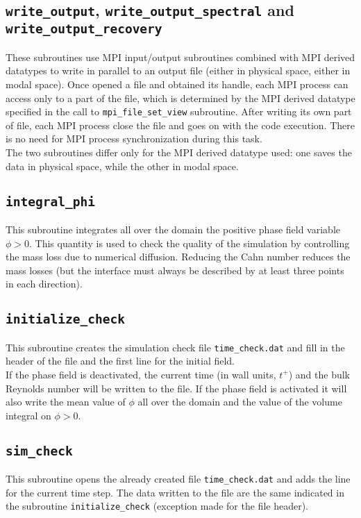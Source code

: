 \subsection{\texttt{write\_output}, \texttt{write\_output\_spectral} and \texttt{write\_output\_recovery}}
\label{sec: writeo}
These subroutines use MPI input/output subroutines combined with MPI derived datatypes to write in parallel to an output file (either in physical space, either in modal space). Once opened a file and obtained its handle, each MPI process can access only to a part of the file, which is determined by the MPI derived datatype specified in the call to \texttt{mpi\_file\_set\_view} subroutine. After writing its own part of file, each MPI process close the file and goes on with the code execution. There is no need for MPI process synchronization during this task.\\
The two subroutines differ only for the MPI derived datatype used: one saves the data in physical space, while the other in modal space.

\subsection{\texttt{integral\_phi}}
This subroutine integrates all over the domain the positive phase field variable $\phi>0$. This quantity is used to check the quality of the simulation by controlling the mass loss due to numerical diffusion. Reducing the Cahn number reduces the mass losses (but the interface must always be described by at least three points in each direction).

\subsection{\texttt{initialize\_check}}
This subroutine creates the simulation check file \texttt{time\_check.dat} and fill in the header of the file and the first line for the initial field.\\ 
If the phase field is deactivated, the current time (in wall units, $t^+$) and the bulk Reynolds number will be written to the file. If the phase field is activated it will also write the mean value of $\phi$ all over the domain and the value of the volume integral on $\phi>0$.

\subsection{\texttt{sim\_check}}
This subroutine opens the already created file \texttt{time\_check.dat} and adds the line for the current time step. The data written to the file are the same indicated in the subroutine \texttt{initialize\_check} (exception made for the file header).


